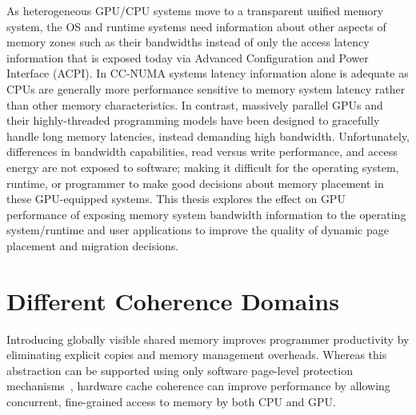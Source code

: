 As heterogeneous GPU/CPU systems move to a transparent unified memory system,
the OS and runtime systems need information about other aspects of memory zones
such as their bandwidths instead of only the access latency information that is
exposed today via Advanced Configuration and Power Interface (ACPI). In CC-NUMA
systems latency information alone is adequate as CPUs are generally more
performance sensitive to memory system latency rather than other memory
characteristics. In contrast, massively parallel GPUs and their highly-threaded
programming models have been designed to gracefully handle long memory
latencies, instead demanding high bandwidth. Unfortunately, differences in
bandwidth capabilities, read versus write performance, and access energy are not
exposed to software; making it difficult for the operating system, runtime, or
programmer to make good decisions about memory placement in these GPU-equipped
systems. This thesis explores the effect on GPU performance of exposing memory
system bandwidth information to the operating system/runtime and user
applications to improve the quality of dynamic page placement and migration
decisions.

\section{Different Coherence Domains}
Introducing globally visible shared memory improves programmer productivity by
eliminating explicit copies and memory management overheads. Whereas this
abstraction can be supported using only software page-level protection
mechanisms~\cite{UVM, HSA}, hardware cache coherence can improve performance by
allowing concurrent, fine-grained access to memory by both CPU and GPU.


